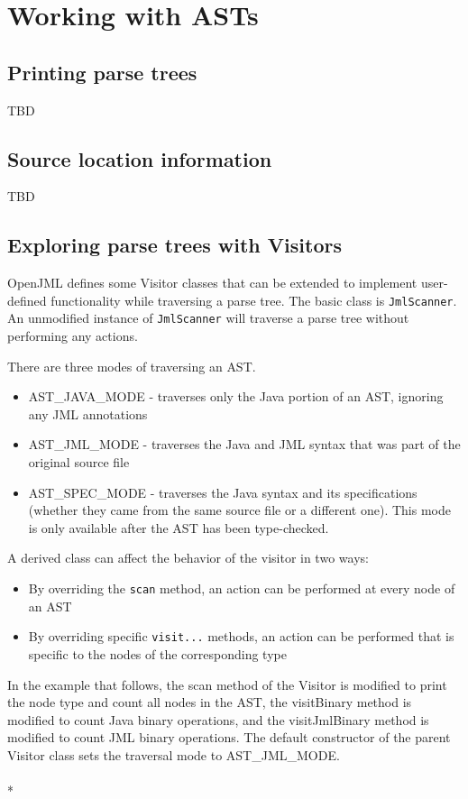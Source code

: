 \documentclass{report}%
\newcommand{\boxspace}{\vspace*{6pt}}
\newlength{\savedrule}
\newlength{\thickrule}
\newlength{\framedwidth}
\newlength{\thickframedwidth}
\newcommand{\boxedinputc}[2]{\boxspace \\ \fbox{\begin{minipage}{1.0\framedwidth}{\tt }\end{minipage}} \setlength{\fboxrule}{\thickrule} \fbox{\begin{minipage}{1.0\thickframedwidth}{\tt }\end{minipage}} \setlength{\fboxrule}{\savedrule} \boxspace\\*}
\newcommand{\source}{../../demos}
\newcommand{\demo}[1]{\boxedinputc{\source/#1.java}{\source/#1.txt}}
\begin{document}
\section{Working with ASTs}

\subsection{Printing parse trees}

TBD

\subsection{Source location information}

TBD

\subsection{Exploring parse trees with Visitors}
OpenJML defines some Visitor classes that can be extended to implement user-defined functionality while traversing a parse tree.
The basic class is {\tt JmlScanner}. An unmodified instance of {\tt JmlScanner} will traverse a parse tree without performing
any actions.

There are three modes of traversing an AST.
\begin{itemize}
\item AST\_JAVA\_MODE - traverses only the Java portion of an AST, ignoring any JML annotations
\item AST\_JML\_MODE - traverses the Java and JML syntax that was part of the original source file
\item AST\_SPEC\_MODE - traverses the Java syntax and its specifications (whether they came from the same source file or a different one). This mode is only available after the AST has been type-checked.
\end{itemize}

A derived class can affect the behavior of the visitor in two ways:
\begin{itemize}
\item By overriding the {\tt scan} method, an action can be performed at every node of an AST
\item By overriding specific {\tt visit...} methods, an action can be performed that is specific to the nodes of the corresponding type
\end{itemize}

In the example that follows, the scan method of the Visitor is modified to print the node type and count all nodes in the AST, the visitBinary method
is modified to count Java binary operations, and the visitJmlBinary method is modified to count JML binary operations.
The default constructor of the parent Visitor class sets the traversal mode to AST\_JML\_MODE.
\demo{DemoWalkTree1}
\end{document}
